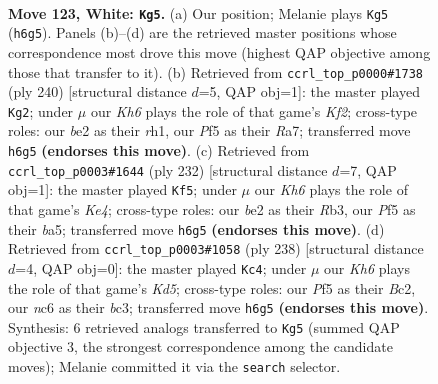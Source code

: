 \documentclass[11pt]{article}
\begin{document}
\clearpage

\begin{figure}[p]\centering
\begin{subfigure}{0.46\textwidth}\centering
\resizebox{\linewidth}{!}{%
\newchessgame
\chessboard[
  setfen={6k1/2B5/2n4K/5P2/8/8/4b3/8 w - - 3 123},
  showmover=false,
  pgfstyle=straightmove, color=movearrow, markmove={h6-g5}
]}
\caption{}
\end{subfigure}\hfill
\begin{subfigure}{0.46\textwidth}\centering
\resizebox{\linewidth}{!}{%
\newchessgame
\chessboard[
  setfen={5B2/R7/8/5k2/2n5/8/5K2/7r w - - 14 121},
  showmover=false,
  pgfstyle=straightmove, color=movearrow, markmove={f2-g2}
]}
\caption{}
\end{subfigure}
\\[4pt]
\begin{subfigure}{0.46\textwidth}\centering
\resizebox{\linewidth}{!}{%
\newchessgame
\chessboard[
  setfen={8/3k1p2/8/b5P1/4K3/1R6/8/8 w - - 87 117},
  showmover=false,
  pgfstyle=straightmove, color=movearrow, markmove={e4-f5}
]}
\caption{}
\end{subfigure}\hfill
\begin{subfigure}{0.46\textwidth}\centering
\resizebox{\linewidth}{!}{%
\newchessgame
\chessboard[
  setfen={8/1R6/8/3K4/6n1/2b5/k1B5/8 w - - 79 120},
  showmover=false,
  pgfstyle=straightmove, color=movearrow, markmove={d5-c4}
]}
\caption{}
\end{subfigure}
\caption{\textbf{Move 123, White: \texttt{Kg5}.} (a) Our position; Melanie plays \texttt{Kg5} (\texttt{h6g5}). Panels (b)--(d) are the retrieved master positions whose correspondence most drove this move (highest QAP objective among those that transfer to it). (b) Retrieved from \texttt{ccrl\_top\_p0000\#1738} (ply 240) [structural distance $d$=5, QAP obj=1]: the master played \texttt{Kg2}; under $\mu$ our \emph{Kh6} plays the role of that game's \emph{Kf2}; cross-type roles: our \emph{b}e2 as their \emph{r}h1, our \emph{P}f5 as their \emph{R}a7; transferred move \texttt{h6g5} \textbf{(endorses this move)}. (c) Retrieved from \texttt{ccrl\_top\_p0003\#1644} (ply 232) [structural distance $d$=7, QAP obj=1]: the master played \texttt{Kf5}; under $\mu$ our \emph{Kh6} plays the role of that game's \emph{Ke4}; cross-type roles: our \emph{b}e2 as their \emph{R}b3, our \emph{P}f5 as their \emph{b}a5; transferred move \texttt{h6g5} \textbf{(endorses this move)}. (d) Retrieved from \texttt{ccrl\_top\_p0003\#1058} (ply 238) [structural distance $d$=4, QAP obj=0]: the master played \texttt{Kc4}; under $\mu$ our \emph{Kh6} plays the role of that game's \emph{Kd5}; cross-type roles: our \emph{P}f5 as their \emph{B}c2, our \emph{n}c6 as their \emph{b}c3; transferred move \texttt{h6g5} \textbf{(endorses this move)}. Synthesis: 6 retrieved analogs transferred to \texttt{Kg5} (summed QAP objective 3, the strongest correspondence among the candidate moves); Melanie committed it via the \texttt{search} selector.}
\label{fig:thought-m244}
\end{figure}
\end{document}
